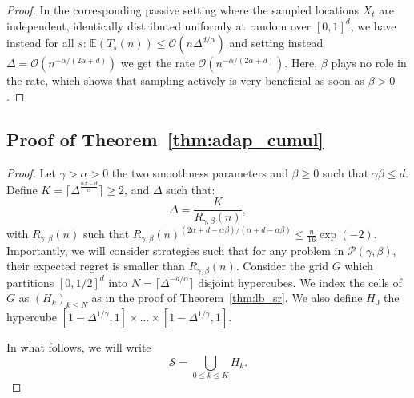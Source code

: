 \documentclass[final,12pt]{colt2018}
\newcommand{\bigO}[1]{\mathcal O\left( #1 \right)}
\begin{document}
\begin{proof}
In the corresponding passive setting where the sampled locations $X_t$ are independent, identically distributed uniformly at random over $[0,1]^d$, we have instead for all $s$: $\mathbb E(T_s(n)) \leq \bigO{n \Delta^{d/\alpha}}$ and setting instead $\Delta = \bigO{n^{-\alpha/(2\alpha+d)}}$ we get the rate $\bigO{n^{-\alpha/(2\alpha+d)}}$. Here, $\beta$ plays no role in the rate, which shows that sampling actively is very beneficial as soon as $\beta > 0$.

\end{proof}



\subsection{Proof of Theorem~\ref{thm:adap_cumul}}
\begin{proof}
Let $\gamma > \alpha > 0$ the two smoothness parameters and $\beta \geq 0$ such that $\gamma\beta \leq d$. Define $K = \lceil{\Delta^{\frac{\alpha\beta - d}{\alpha}}\rceil} \geq 2$, and $\Delta$ such that:
$$
\Delta = \frac{K}{R_{\gamma,\beta}(n)},
$$
with $R_{\gamma,\beta}(n)$ such that $R_{\gamma,\beta}(n)^{(2\alpha+d-\alpha\beta)/(\alpha+d-\alpha\beta)} \leq \frac{n}{16}\exp(-2)$. Importantly, we will consider strategies such that for any problem in $\mathcal P(\gamma,\beta)$, their expected regret is smaller than $R_{\gamma,\beta}(n)$. Consider the grid $G$ which partitions $[0,1/2]^d$ into $N = \lceil \Delta^{-d/\alpha} \rceil$ disjoint hypercubes. We index the cells of $G$ as $(H_k)_{k\leq N}$ as in the proof of Theorem~\ref{thm:lb_sr}. We also define $H_0$ the hypercube $[1-\Delta^{1/\gamma},1] \times ... \times [1-\Delta^{1/\gamma},1]$.



In what follows, we will write
$$\mathcal S = \bigcup_{0 \leq k\leq K} H_k.$$


\noindent


\end{proof}
\end{document}
